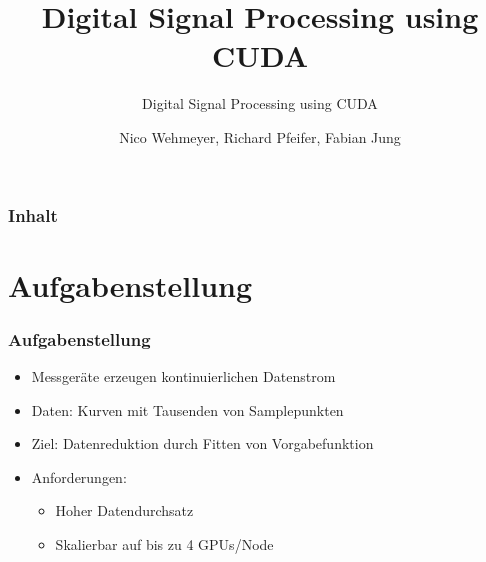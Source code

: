 \documentclass[ddcfooter]{tudbeamer}
\begin{document}
\title[Digital Signal Processing]{Digital Signal Processing using CUDA}
\subtitle{Digital Signal Processing using CUDA}
\author{Nico Wehmeyer, Richard Pfeifer, Fabian Jung}

\maketitle

\begin{frame}
    \frametitle*{Inhalt}
    \tableofcontents[currentsection]
\end{frame}

\section{Aufgabenstellung}
\begin{frame}
\frametitle{Aufgabenstellung}
\begin{minipage}{0.475\textwidth}
\begin{itemize} 
    \item{Messgeräte erzeugen kontinuierlichen Datenstrom}
    \item{Daten: Kurven mit Tausenden von Samplepunkten}
    \item{Ziel: Datenreduktion durch Fitten von Vorgabefunktion}
    \item{Anforderungen:}
    \begin{itemize}
	    \item{Hoher Datendurchsatz}
	    \item{Skalierbar auf bis zu 4 GPUs/Node}
    \end{itemize}
\end{itemize}
\end{minipage} \hfill
\begin{minipage}{0.475\textwidth}
    \begin{figure}

\end{figure}
\end{minipage}
\end{frame}
\end{document}
